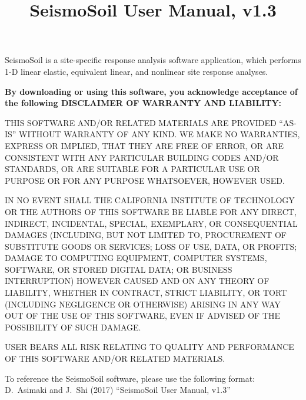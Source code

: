 \documentclass[11pt,letterpaper]{article}
\title{\textbf{\textsf{\huge{SeismoSoil User Manual,} \LARGE{v1.3}}}}
\date{}
\begin{document}
  \maketitle
  \thispagestyle{empty}    %
  \vspace{-10pt}

SeismoSoil is a site-specific response analysis software application, which performs 1-D linear elastic, equivalent linear, and nonlinear site response analyses.
    

\begin{framed}
	\begin{center}
		\textbf{By downloading or using this software, you acknowledge acceptance of the following DISCLAIMER OF WARRANTY AND LIABILITY:}
	\end{center}
	
	{\sffamily
			THIS SOFTWARE AND/OR RELATED MATERIALS ARE PROVIDED ``AS-IS'' WITHOUT WARRANTY OF ANY KIND. WE MAKE NO WARRANTIES, EXPRESS OR IMPLIED, THAT THEY ARE FREE OF ERROR, OR ARE CONSISTENT WITH ANY PARTICULAR BUILDING CODES AND/OR STANDARDS, OR ARE SUITABLE FOR A PARTICULAR USE OR PURPOSE OR FOR ANY PURPOSE WHATSOEVER, HOWEVER USED.
			
			IN NO EVENT SHALL THE CALIFORNIA INSTITUTE OF TECHNOLOGY OR THE AUTHORS OF THIS SOFTWARE BE LIABLE FOR ANY DIRECT, INDIRECT, INCIDENTAL, SPECIAL, EXEMPLARY, OR CONSEQUENTIAL DAMAGES (INCLUDING, BUT NOT LIMITED TO, PROCUREMENT OF SUBSTITUTE GOODS OR SERVICES; LOSS OF USE, DATA, OR PROFITS; DAMAGE TO COMPUTING EQUIPMENT, COMPUTER SYSTEMS, SOFTWARE, OR STORED DIGITAL DATA; OR BUSINESS INTERRUPTION) HOWEVER CAUSED AND ON ANY THEORY OF LIABILITY, WHETHER IN CONTRACT, STRICT LIABILITY, OR TORT (INCLUDING NEGLIGENCE OR OTHERWISE) ARISING IN ANY WAY OUT OF THE USE OF THIS SOFTWARE, EVEN IF ADVISED OF THE POSSIBILITY OF SUCH DAMAGE.
			
			USER BEARS ALL RISK RELATING TO QUALITY AND PERFORMANCE OF THIS SOFTWARE AND/OR RELATED MATERIALS.
			
	}
	
	\vspace{0.5cm}
\end{framed}

\begin{center}
To reference the SeismoSoil software, please use the following format:\\
D.~Asimaki and J.~Shi (2017) ``SeismoSoil User Manual, v1.3''
\end{center}
\end{document}
